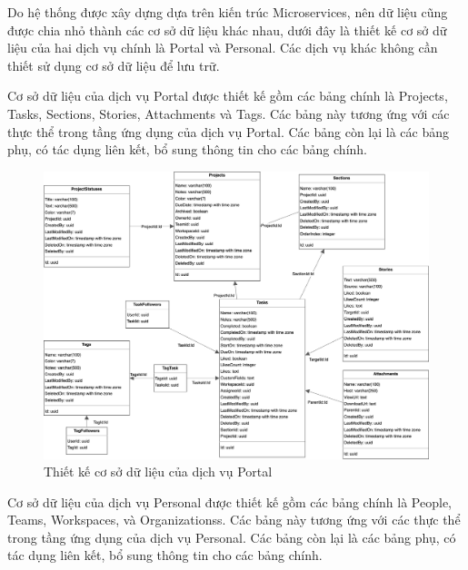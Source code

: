 \documentclass[../DoAn.tex]{subfiles}
\begin{document}
Do hệ thống được xây dựng dựa trên kiến trúc Microservices, nên dữ liệu cũng được chia nhỏ thành các cơ sở dữ liệu khác nhau, dưới đây là thiết kế cơ sở dữ liệu của
hai dịch vụ chính là Portal và Personal. Các dịch vụ khác không cần thiết sử dụng cơ sở dữ liệu để lưu trữ.

Cơ sở dữ liệu của dịch vụ Portal được thiết kế gồm các bảng chính là Projects, Tasks, Sections, Stories, Attachments và Tags. Các bảng này tương ứng với các thực thể
trong tầng ứng dụng của dịch vụ Portal. Các bảng còn lại là các bảng phụ, có tác dụng liên kết, bổ sung thông tin cho các bảng chính.

\begin{figure}[H]
    \centering
    \includegraphics[width=1.1\linewidth]{Hinhve/PortalDbDiagram.png}
    \caption{Thiết kế cơ sở dữ liệu của dịch vụ Portal}
    \label{fig:PortalDbDiagram}
\end{figure}

Cơ sở dữ liệu của dịch vụ Personal được thiết kế gồm các bảng chính là People, Teams, Workspaces, và Organizationss. Các bảng này tương ứng với các thực thể
trong tầng ứng dụng của dịch vụ Personal. Các bảng còn lại là các bảng phụ, có tác dụng liên kết, bổ sung thông tin cho các bảng chính.
\end{document}
